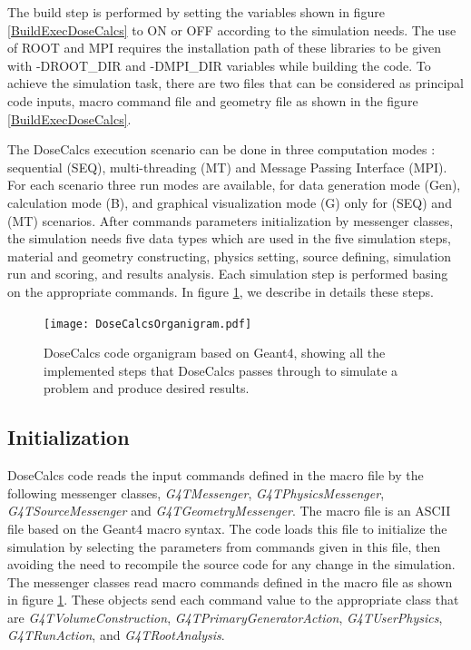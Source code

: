 \documentclass[letterpaper,12pt]{article}
\begin{document}
The build step is performed by setting the variables shown in figure \ref{BuildExecDoseCalcs} to ON or OFF according to the simulation needs. The use of ROOT and MPI requires the installation path of these libraries to be given with -DROOT\_DIR and -DMPI\_DIR variables while building the code. To achieve the simulation task, there are two files that can be considered as principal code inputs, macro command file and geometry file as shown in the figure \ref{BuildExecDoseCalcs}.

The DoseCalcs execution scenario can be done in three computation modes : sequential (SEQ), multi-threading (MT) and Message Passing Interface (MPI). For each scenario three run modes are available, for data generation mode (Gen), calculation mode (B), and graphical visualization mode (G) only for (SEQ) and (MT) scenarios. After commands parameters initialization by messenger classes, the simulation needs five data types which are used in the five simulation steps, material and geometry constructing, physics setting, source defining, simulation run and scoring, and results analysis. Each simulation step is performed basing on the appropriate commands. In figure \ref{DoseCalcsOrganigram}, we describe in details these steps. 

\begin{figure}[H] 
	\texttt{[image: DoseCalcsOrganigram.pdf]} 
    \centering
	\caption{DoseCalcs code organigram based on Geant4, showing all the implemented steps that DoseCalcs passes through to simulate a problem and produce desired results.}
	\label{DoseCalcsOrganigram}
\end{figure}

\subsection{Initialization}

DoseCalcs code reads the input commands defined in the macro file by the following messenger classes, \textit{G4TMessenger}, \textit{G4TPhysicsMessenger}, \textit{G4TSourceMessenger} and \textit{G4TGeometryMessenger}.
The macro file is an ASCII file based on the Geant4 macro syntax. The code loads this file to initialize the simulation by selecting the parameters from commands given in this file, then avoiding the need to recompile the source code for any change in the simulation.
The messenger classes read macro commands defined in the macro file as shown in figure \ref{DoseCalcsOrganigram}. These objects send each command value to the appropriate class that are \textit{G4TVolumeConstruction}, \textit{G4TPrimaryGeneratorAction}, \textit{G4TUserPhysics}, \textit{G4TRunAction}, and \textit{G4TRootAnalysis}.
\end{document}
